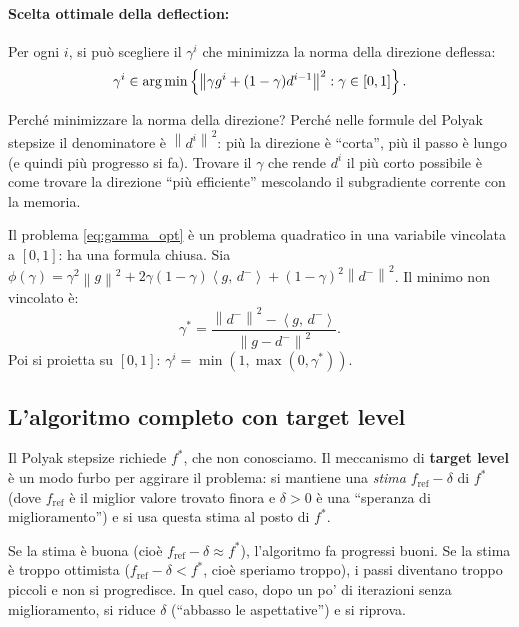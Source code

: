 \documentclass[a4paper,11pt]{article}
\theoremstyle{definition}
\newcommand{\norm}[1]{\left\lVert #1 \right\rVert}
\newcommand{\inner}[2]{\left\langle #1,\, #2 \right\rangle}
\newcommand{\argmin}{\operatornamewithlimits{arg\,min}}
\begin{document}
\paragraph{Scelta ottimale della deflection:} Per ogni $i$, si può scegliere il $\gamma^i$ che minimizza la norma della direzione deflessa:
\begin{equation}\label{eq:gamma_opt}
  \gamma^i \in \argmin\left\{\norm{\gamma g^i + (1-\gamma)d^{i-1}}^2 : \gamma \in [0, 1]\right\}.
\end{equation}

\begin{intuizione}
Perché minimizzare la norma della direzione? Perché nelle formule del Polyak stepsize il denominatore è $\norm{d^i}^2$: più la direzione è ``corta'', più il passo è lungo (e quindi più progresso si fa). Trovare il $\gamma$ che rende $d^i$ il più corto possibile è come trovare la direzione ``più efficiente'' mescolando il subgradiente corrente con la memoria.

Il problema \eqref{eq:gamma_opt} è un problema quadratico in una variabile vincolata a $[0,1]$: ha una formula chiusa. Sia $\phi(\gamma) = \gamma^2\norm{g}^2 + 2\gamma(1-\gamma)\inner{g}{d^{-}} + (1-\gamma)^2\norm{d^{-}}^2$. Il minimo non vincolato è:
\[
  \gamma^* = \frac{\norm{d^{-}}^2 - \inner{g}{d^{-}}}{\norm{g - d^{-}}^2}.
\]
Poi si proietta su $[0,1]$: $\gamma^i = \min(1, \max(0, \gamma^*))$.
\end{intuizione}

\subsection{L'algoritmo completo con target level}
\label{subsec:target_level}

\begin{intuizione}
Il Polyak stepsize richiede $f^*$, che non conosciamo. Il meccanismo di \textbf{target level} è un modo furbo per aggirare il problema: si mantiene una \emph{stima} $f_{\text{ref}} - \delta$ di $f^*$ (dove $f_{\text{ref}}$ è il miglior valore trovato finora e $\delta > 0$ è una ``speranza di miglioramento'') e si usa questa stima al posto di $f^*$.

Se la stima è buona (cioè $f_{\text{ref}} - \delta \approx f^*$), l'algoritmo fa progressi buoni. Se la stima è troppo ottimista ($f_{\text{ref}} - \delta < f^*$, cioè speriamo troppo), i passi diventano troppo piccoli e non si progredisce. In quel caso, dopo un po' di iterazioni senza miglioramento, si riduce $\delta$ (``abbasso le aspettative'') e si riprova.
\end{intuizione}
\end{document}

